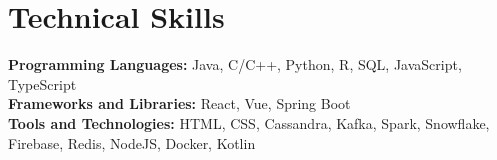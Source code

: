 \documentclass[letterpaper,11pt]{article}
\begin{document}
  \section{Technical Skills}
    \begin{itemize}[leftmargin=0.00in, label={}]
        \small{\item{
          \textbf{Programming Languages:} {Java, C/C++, Python, R, SQL, JavaScript, TypeScript} \\
          \textbf{Frameworks and Libraries:} {React, Vue, Spring Boot} \\
          \textbf{Tools and Technologies:} {HTML, CSS, Cassandra, Kafka, Spark, Snowflake, Firebase, Redis, NodeJS, Docker, Kotlin} \\
        }}
    \end{itemize}
\end{document}
